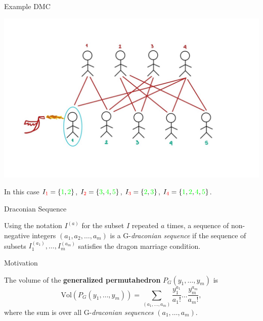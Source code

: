 \documentclass{beamer}
\begin{document}
\begin{frame}{Example DMC}
    \begin{center}
    \includegraphics[scale=0.18]{images/DragonMarriageCondition.jpeg}
\end{center}
In this case $I_{\color{red}1}= \{\color{green}1 \color{black},\color{green}2\color{black}\}$, $I_{\color{red}2}= \{\color{green}3\color{black},\color{green}4\color{black}, \color{green}5\color{black}\}$, $I_{\color{red}3}= \{\color{green}2\color{black},\color{green}3\color{black}\}$, $I_{\color{red}4}= \{\color{green}1\color{black},\color{green}2\color{black}, \color{green}4\color{black},\color{green}5\color{black}\}$.
\end{frame}

\begin{frame}{Draconian Sequence}
\begin{definition}
 Using the notation $I^{(a)}$ for the subset $I$ repeated $a$ times, a sequence of non-negative integers $(a_1, a_2, \dots, a_m)$ is a G-\textit{draconian sequence} if the sequence of subsets $I_1^{(a_1)}, \dots, I_m^{(a_m)}$ satisfies the dragon marriage condition.
\end{definition}
\end{frame}

\begin{frame}{Motivation}
\begin{theorem}[Postnikov-2005]
The volume of the \textbf{generalized permutahedron} $P_G(y_1, \dots, y_m)$ is
$$\text{Vol} \left (P_G(y_1,\dots,y_m)\right )= \sum_{(a_1,\dots, a_m)} \frac{y_1^{a_1}}{a_1!}\dots \frac{y_m^{a_m}}{a_m!},$$
where the sum is over all G-\textit{draconian sequences} $(a_1, \dots, a_m)$.
\end{theorem}
\end{frame}
\end{document}
